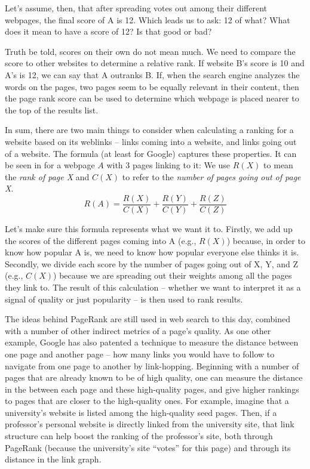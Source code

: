 Let's assume, then, that after spreading votes out among their
different webpages, the final score of A is 12.  Which leads us to
ask: 12 of what?  What does it mean to have a score of 12?  Is that
good or bad?

Truth be told, scores on their own do not mean much.  We need to
compare the score to other websites to determine a relative rank.  If
website B's score is 10 and A's is 12, we can say that A outranks B.  If, when the search engine analyzes the words on the pages,
two pages seem to be equally relevant in their
content, then the page rank score can be used to determine which webpage is 
placed nearer to the top of the results list.

In sum, there are two main things to consider when calculating
a ranking for a website based on its weblinks -- links coming into a
website, and links going out of a website.  The formula (at least for
Google) captures these properties.  It can be seen in
 for a webpage $A$ with 3 pages linking to it: We
use $R(X)$ to mean the \emph{rank of page X} and $C(X)$ to refer to
the \emph{number of pages going out of page X}.
\begin{equation} 
\label{ex:pagerank} 
R(A) = \frac{R(X)}{C(X)} + \frac{R(Y)}{C(Y)} + \frac{R(Z)}{C(Z)}
\end{equation}

Let's make sure this formula represents what we want it to.  Firstly,
we add up the scores of the different pages coming into A (e.g.,
$R(X)$) because, in order to know how popular A is, we need to know
how popular everyone else thinks it is.  Secondly, we divide each
score by the number of pages going out of X, Y, and Z (e.g., $C(X)$)
because we are spreading out their weights among all the pages they
link to.  The result of this calculation -- whether we want to interpret it as a signal of quality or just popularity -- is then used to rank results.

The ideas behind PageRank are still used in web search to this day, combined with a number of other indirect metrics of a page's quality.  As one other example, Google has also patented a technique \citep{Hajaj:2015} to measure the distance between one page and another page -- how many links you would have to follow to navigate from one page to another by link-hopping.  Beginning with a number of  pages that are already known to be of high quality, one can measure the distance in the  between each page and these high-quality pages,  and give higher rankings to pages that are closer to the high-quality ones.  For example, imagine that a university's website is listed among the high-quality seed pages.  Then, if a professor's personal website is directly linked from the university site, that link structure can help boost the ranking of the professor's site, both through PageRank (because the university's site ``votes'' for this page) and through its distance in the link graph.



